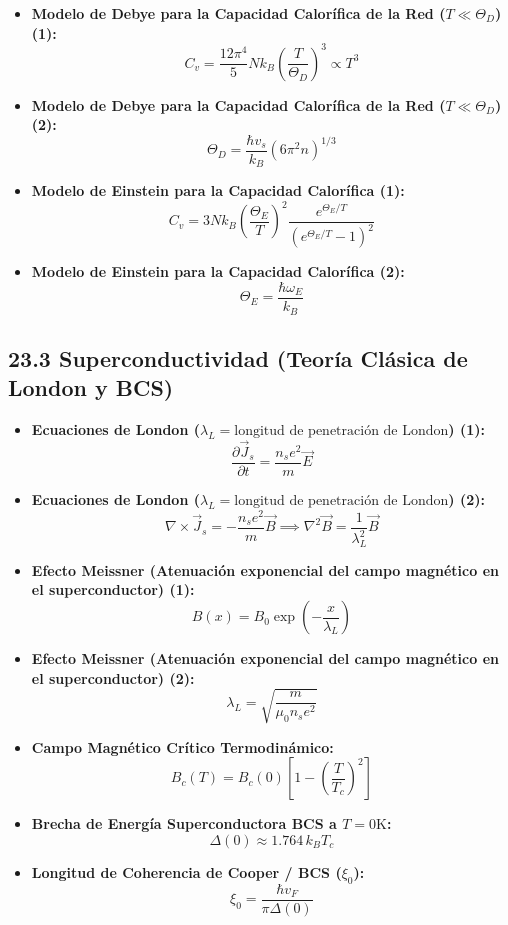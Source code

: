 \documentclass[11pt,a4paper]{article}
\begin{document}
\begin{itemize}
  \item \textbf{Modelo de Debye para la Capacidad Calorífica de la Red ($T \ll \Theta_D$) (1):}
  \[
    C_v = \frac{12\pi^4}{5} N k_B \left( \frac{T}{\Theta_D} \right)^3 \propto T^3
  \]
  \item \textbf{Modelo de Debye para la Capacidad Calorífica de la Red ($T \ll \Theta_D$) (2):}
  \[
    \Theta_D = \frac{\hbar v_s}{k_B}(6\pi^2 n)^{1/3}
  \]
  \item \textbf{Modelo de Einstein para la Capacidad Calorífica (1):}
  \[
    C_v = 3 N k_B \left( \frac{\Theta_E}{T} \right)^2 \frac{e^{\Theta_E / T}}{(e^{\Theta_E / T} - 1)^2}
  \]
  \item \textbf{Modelo de Einstein para la Capacidad Calorífica (2):}
  \[
    \Theta_E = \frac{\hbar\omega_E}{k_B}
  \]
\end{itemize}

\subsection*{23.3 Superconductividad (Teoría Clásica de London y BCS)}

\begin{itemize}
  \item \textbf{Ecuaciones de London ($\lambda_L = \text{longitud de penetración de London}$) (1):}
  \[
    \frac{\partial \vec{J}_s}{\partial t} = \frac{n_s e^2}{m} \vec{E}
  \]
  \item \textbf{Ecuaciones de London ($\lambda_L = \text{longitud de penetración de London}$) (2):}
  \[
    \nabla \times \vec{J}_s = -\frac{n_s e^2}{m}\vec{B} \implies \nabla^2\vec{B} = \frac{1}{\lambda_L^2}\vec{B}
  \]
  \item \textbf{Efecto Meissner (Atenuación exponencial del campo magnético en el superconductor) (1):}
  \[
    B(x) = B_0 \exp\left( -\frac{x}{\lambda_L} \right)
  \]
  \item \textbf{Efecto Meissner (Atenuación exponencial del campo magnético en el superconductor) (2):}
  \[
    \lambda_L = \sqrt{\frac{m}{\mu_0 n_s e^2}}
  \]
  \item \textbf{Campo Magnético Crítico Termodinámico:}
  \[
    B_c(T) = B_c(0)\left[ 1 - \left( \frac{T}{T_c} \right)^2 \right]
  \]
  \item \textbf{Brecha de Energía Superconductora BCS a $T = 0\mathrm{ K}$:}
  \[
    \Delta(0) \approx 1.764 \, k_B T_c
  \]
  \item \textbf{Longitud de Coherencia de Cooper / BCS ($\xi_0$):}
  \[
    \xi_0 = \frac{\hbar v_F}{\pi \Delta(0)}
  \]
\end{itemize}
\end{document}
